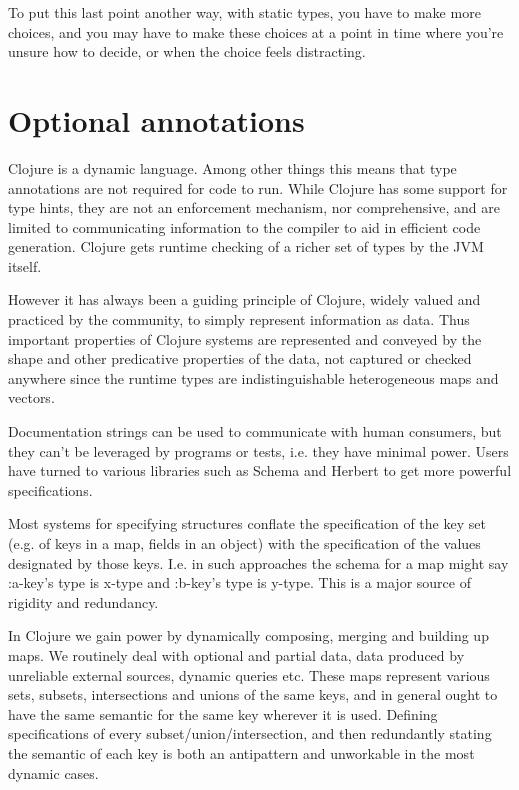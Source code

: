 To put this last point another way, with static types, you have to make more
choices, and you may have to make these choices at a point in time where you’re
unsure how to decide, or when the choice feels distracting.

\section{Optional annotations}

Clojure is a dynamic language. Among other things this means that type
annotations are not required for code to run. While Clojure has some support for
type hints, they are not an enforcement mechanism, nor comprehensive, and are
limited to communicating information to the compiler to aid in efficient code
generation. Clojure gets runtime checking of a richer set of types by the JVM
itself.

However it has always been a guiding principle of Clojure, widely valued and
practiced by the community, to simply represent information as data. Thus
important properties of Clojure systems are represented and conveyed by the
shape and other predicative properties of the data, not captured or checked
anywhere since the runtime types are indistinguishable heterogeneous maps and
vectors.

Documentation strings can be used to communicate with human consumers, but they
can’t be leveraged by programs or tests, i.e. they have minimal power. Users
have turned to various libraries such as Schema and Herbert to get more powerful
specifications.

Most systems for specifying structures conflate the specification of the key set
(e.g. of keys in a map, fields in an object) with the specification of the
values designated by those keys. I.e. in such approaches the schema for a map
might say :a-key’s type is x-type and :b-key’s type is y-type. This is a major
source of rigidity and redundancy.

In Clojure we gain power by dynamically composing, merging and building up maps.
We routinely deal with optional and partial data, data produced by unreliable
external sources, dynamic queries etc. These maps represent various sets,
subsets, intersections and unions of the same keys, and in general ought to have
the same semantic for the same key wherever it is used. Defining specifications
of every subset/union/intersection, and then redundantly stating the semantic of
each key is both an antipattern and unworkable in the most dynamic cases.

